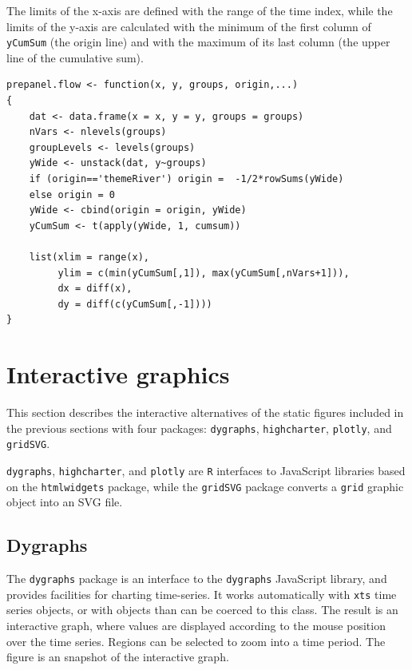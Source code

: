 The limits of the x-axis are defined with the range of the time index,
while the limits of the y-axis are calculated with the minimum of the
first column of \texttt{yCumSum} (the origin line) and with the maximum of
its last column (the upper line of the cumulative sum).

\lstset{language=r,label= ,caption= ,captionpos=b,numbers=none}
\begin{lstlisting}
prepanel.flow <- function(x, y, groups, origin,...)
{
    dat <- data.frame(x = x, y = y, groups = groups)
    nVars <- nlevels(groups)
    groupLevels <- levels(groups)
    yWide <- unstack(dat, y~groups)
    if (origin=='themeRiver') origin =  -1/2*rowSums(yWide)
    else origin = 0
    yWide <- cbind(origin = origin, yWide)
    yCumSum <- t(apply(yWide, 1, cumsum))
    
    list(xlim = range(x),
         ylim = c(min(yCumSum[,1]), max(yCumSum[,nVars+1])),
         dx = diff(x),
         dy = diff(c(yCumSum[,-1])))
}
\end{lstlisting}


\section{Interactive graphics \label{sec:interactive_horizontal}}
\label{sec:org4f6bfd9}
This section describes the interactive alternatives of the static
figures included in the previous sections with four packages:
\texttt{dygraphs}, \texttt{highcharter}, \texttt{plotly}, and \texttt{gridSVG}.

\texttt{dygraphs}, \texttt{highcharter}, and \texttt{plotly} are \texttt{R} interfaces to
JavaScript libraries based on the \texttt{htmlwidgets} package, while the
\texttt{gridSVG} package converts a \texttt{grid} graphic object into an SVG file.

\subsection{Dygraphs \label{sec:dygraphs}}
\label{sec:org11293b1}
The \texttt{dygraphs} package is an interface to the \texttt{dygraphs} JavaScript
library, and provides facilities for charting time-series. It works
automatically with \texttt{xts} time series objects, or with objects than can
be coerced to this class. The result is an interactive graph, where
values are displayed according to the mouse position over the time
series. Regions can be selected to zoom into a time period. The figure
\label{fig:dygraphs} is an snapshot of the interactive graph.

